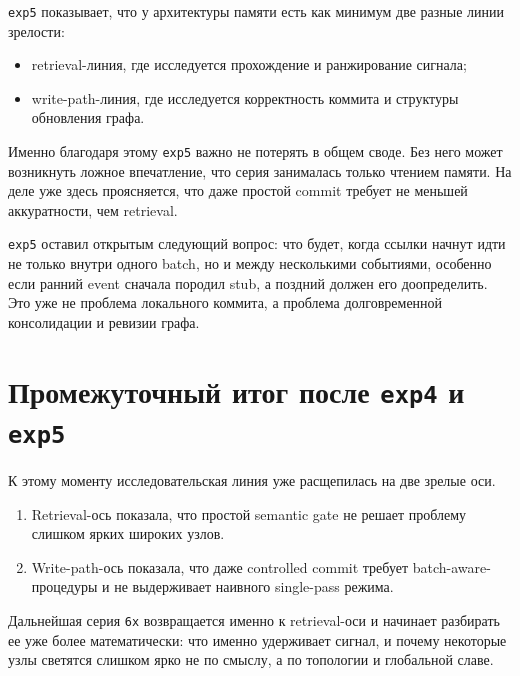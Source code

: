 \texttt{exp5} показывает, что у архитектуры памяти есть как минимум две разные
линии зрелости:

\begin{itemize}[leftmargin=2em]
\item retrieval-линия, где исследуется прохождение и ранжирование сигнала;
\item write-path-линия, где исследуется корректность коммита и структуры
обновления графа.
\end{itemize}

Именно благодаря этому \texttt{exp5} важно не потерять в общем своде. Без него
может возникнуть ложное впечатление, что серия занималась только чтением памяти.
На деле уже здесь проясняется, что даже простой commit требует не меньшей
аккуратности, чем retrieval.

\begin{openbox}
\texttt{exp5} оставил открытым следующий вопрос: что будет, когда ссылки начнут
идти не только внутри одного batch, но и между несколькими событиями, особенно
если ранний event сначала породил stub, а поздний должен его доопределить. Это
уже не проблема локального коммита, а проблема долговременной консолидации и
ревизии графа.
\end{openbox}

\section{Промежуточный итог после \texttt{exp4} и \texttt{exp5}}

К этому моменту исследовательская линия уже расщепилась на две зрелые оси.

\begin{enumerate}[leftmargin=2em]
\item Retrieval-ось показала, что простой semantic gate не решает проблему
слишком ярких широких узлов.
\item Write-path-ось показала, что даже controlled commit требует
batch-aware-процедуры и не выдерживает наивного single-pass режима.
\end{enumerate}

Дальнейшая серия \texttt{6x} возвращается именно к retrieval-оси и начинает
разбирать ее уже более математически: что именно удерживает сигнал, и почему
некоторые узлы светятся слишком ярко не по смыслу, а по топологии и глобальной
славе.
